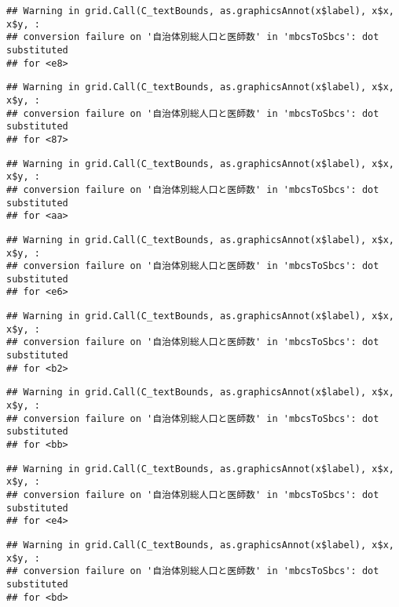 \documentclass[
]{article}
\begin{document}
\begin{verbatim}
## Warning in grid.Call(C_textBounds, as.graphicsAnnot(x$label), x$x, x$y, :
## conversion failure on '自治体別総人口と医師数' in 'mbcsToSbcs': dot substituted
## for <e8>
\end{verbatim}

\begin{verbatim}
## Warning in grid.Call(C_textBounds, as.graphicsAnnot(x$label), x$x, x$y, :
## conversion failure on '自治体別総人口と医師数' in 'mbcsToSbcs': dot substituted
## for <87>
\end{verbatim}

\begin{verbatim}
## Warning in grid.Call(C_textBounds, as.graphicsAnnot(x$label), x$x, x$y, :
## conversion failure on '自治体別総人口と医師数' in 'mbcsToSbcs': dot substituted
## for <aa>
\end{verbatim}

\begin{verbatim}
## Warning in grid.Call(C_textBounds, as.graphicsAnnot(x$label), x$x, x$y, :
## conversion failure on '自治体別総人口と医師数' in 'mbcsToSbcs': dot substituted
## for <e6>
\end{verbatim}

\begin{verbatim}
## Warning in grid.Call(C_textBounds, as.graphicsAnnot(x$label), x$x, x$y, :
## conversion failure on '自治体別総人口と医師数' in 'mbcsToSbcs': dot substituted
## for <b2>
\end{verbatim}

\begin{verbatim}
## Warning in grid.Call(C_textBounds, as.graphicsAnnot(x$label), x$x, x$y, :
## conversion failure on '自治体別総人口と医師数' in 'mbcsToSbcs': dot substituted
## for <bb>
\end{verbatim}

\begin{verbatim}
## Warning in grid.Call(C_textBounds, as.graphicsAnnot(x$label), x$x, x$y, :
## conversion failure on '自治体別総人口と医師数' in 'mbcsToSbcs': dot substituted
## for <e4>
\end{verbatim}

\begin{verbatim}
## Warning in grid.Call(C_textBounds, as.graphicsAnnot(x$label), x$x, x$y, :
## conversion failure on '自治体別総人口と医師数' in 'mbcsToSbcs': dot substituted
## for <bd>
\end{verbatim}
\end{document}
